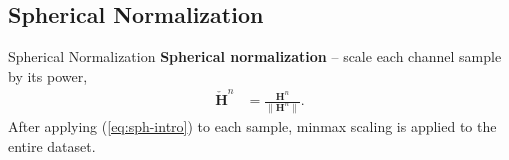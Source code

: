 \documentclass{beamer}
\newcommand{\fignocap}[2]{
	\begin{figure}[!hbtp]
	    \centering
		\texttt{[image: \#2]}
	\end{figure}
}
\begin{document}


\subsection{Spherical Normalization}
  \begin{frame}{Spherical Normalization}
    \textbf{Spherical normalization} -- scale each channel sample by its power,
    \begin{align}
      \mathbf{\check H}^n &= \frac{\mathbf H^n}{\|\mathbf H^n\|}. \label{eq:sph-intro}
    \end{align}
    After applying (\ref{eq:sph-intro}) to each sample, minmax scaling is applied to the entire dataset.
  \end{frame}
\end{document}
